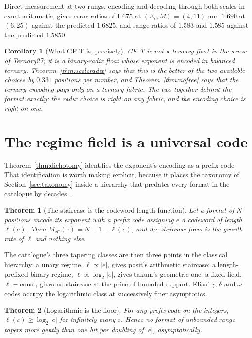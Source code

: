\documentclass[11pt]{article}
\newtheorem{theorem}{Theorem}
\newtheorem{corollary}{Corollary}
\theoremstyle{definition}
\begin{document}
Direct measurement at two rungs, encoding and decoding through both scales in
exact arithmetic, gives error ratios of $1.675$ at $(E_t,M) = (4,11)$ and $1.690$
at $(6,25)$ against the predicted $1.6825$, and range ratios of $1.583$ and
$1.585$ against the predicted $1.5850$.

\begin{corollary}[What GF-T is, precisely]
GF-T is not a ternary float in the sense of Ternary27; it is a binary-radix float
whose exponent is \emph{encoded} in balanced ternary. Theorem~\ref{thm:scaleradix}
says that this is the better of the two available choices by $0.331$ positions per
number, and Theorem~\ref{thm:nofree} says that the ternary encoding pays only on a
ternary fabric. The two together delimit the format exactly: the radix choice is
right on any fabric, and the encoding choice is right on one.
\end{corollary}


\section{The regime field is a universal code}
\label{sec:codes}

Theorem~\ref{thm:dichotomy} identifies the exponent's encoding as a prefix code.
That identification is worth making explicit, because it places the taxonomy of
Section~\ref{sec:taxonomy} inside a hierarchy that predates every format in the
catalogue by decades~\cite{elias1975}.

\begin{theorem}[The staircase is the codeword-length function]
\label{thm:code}
Let a format of $N$ positions encode its exponent with a prefix code assigning
$e$ a codeword of length $\ell(e)$. Then
$M_{\mathrm{eff}}(e) = N - 1 - \ell(e)$, and the staircase form is the growth
rate of $\ell$ and nothing else.
\end{theorem}

The catalogue's three tapering classes are then three points in the classical
hierarchy: a unary regime, $\ell \propto |e|$, gives posit's arithmetic
staircase; a length-prefixed binary regime, $\ell \propto \log_2|e|$, gives
takum's geometric one; a fixed field, $\ell = \mathrm{const}$, gives no staircase
at the price of bounded support. Elias' $\gamma$, $\delta$ and $\omega$ codes
occupy the logarithmic class at successively finer asymptotics.

\begin{theorem}[Logarithmic is the floor]
\label{thm:floor}
For any prefix code on the integers, $\ell(e) \geq \log_2|e|$ for infinitely many
$e$. Hence no format of unbounded range tapers more gently than one bit per
doubling of $|e|$, asymptotically.
\end{theorem}
\end{document}
